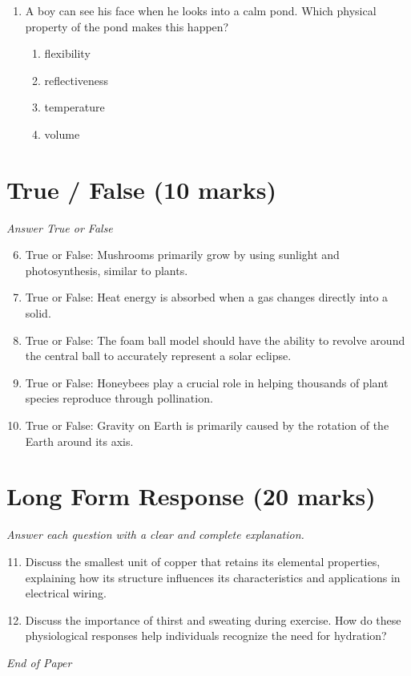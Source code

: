 \documentclass[12pt]{article}
\begin{document}
\begin{enumerate}[label=\arabic*.]
\begin{enumerate}[label=(\alph*)]
    \item one that eats meat
    \item one that uses plants for shelter
    \item one that lives under the ground
    \item one that builds nests on the ground
\end{enumerate}
\item A boy can see his face when he looks into a calm pond. Which physical property of the pond makes this happen?
\begin{enumerate}[label=(\alph*)]
    \item flexibility
    \item reflectiveness
    \item temperature
    \item volume
\end{enumerate}
\end{enumerate}

\section*{True / False (10 marks)}
\textit{Answer True or False}
\begin{enumerate}[label=\arabic*.]
\setcounter{enumi}{5}
\item True or False: Mushrooms primarily grow by using sunlight and photosynthesis, similar to plants.
\item True or False: Heat energy is absorbed when a gas changes directly into a solid.
\item True or False: The foam ball model should have the ability to revolve around the central ball to accurately represent a solar eclipse.
\item True or False: Honeybees play a crucial role in helping thousands of plant species reproduce through pollination.
\item True or False: Gravity on Earth is primarily caused by the rotation of the Earth around its axis.
\end{enumerate}

\section*{Long Form Response (20 marks)}
\textit{Answer each question with a clear and complete explanation.}
\begin{enumerate}[label=\arabic*.]
\setcounter{enumi}{10}
\item Discuss the smallest unit of copper that retains its elemental properties, explaining how its structure influences its characteristics and applications in electrical wiring.
\item Discuss the importance of thirst and sweating during exercise. How do these physiological responses help individuals recognize the need for hydration?
\end{enumerate}

\vfill
\noindent\textit{End of Paper}
\end{document}
